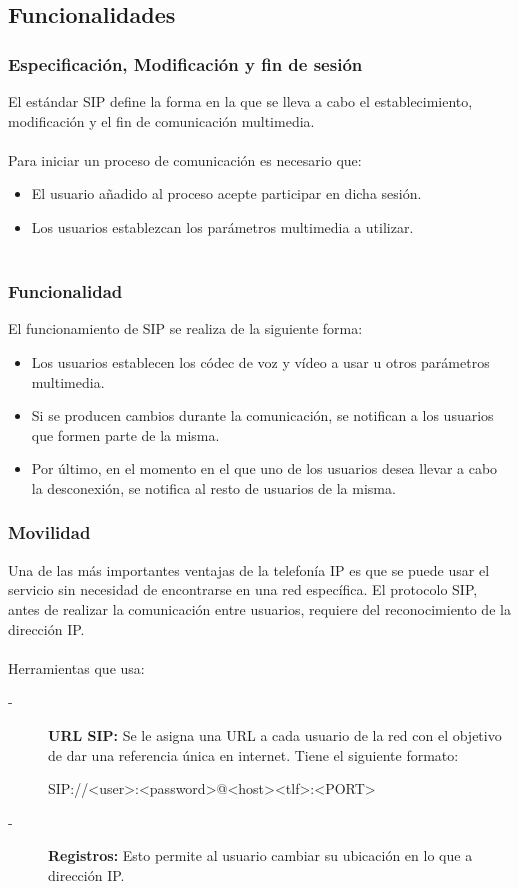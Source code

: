 \documentclass{beamer}
\begin{document}
	\subsection{Funcionalidades}
	\begin{frame}
	\frametitle{Especificación, Modificación y fin de sesión}
		El estándar SIP define la forma en la que se lleva a cabo el establecimiento, modificación y el fin de comunicación multimedia. \\~\\
		Para iniciar un proceso de comunicación es necesario que:
		\begin{itemize}
			\item El usuario añadido al proceso acepte participar en dicha sesión.
			\item Los usuarios establezcan los parámetros multimedia a utilizar.\\~\\
		\end{itemize}
	\end{frame}
	
	\begin{frame}
	\frametitle{Funcionalidad}
		El funcionamiento de SIP se realiza de la siguiente forma:
		\begin{itemize}
			\item Los usuarios establecen los códec de voz y vídeo a usar u otros parámetros multimedia.
			\item Si se producen cambios durante la comunicación, se notifican a los usuarios que formen parte de la misma.
			\item Por último, en el momento en el que uno de los usuarios desea llevar a cabo la desconexión, se notifica al resto de usuarios de la misma.
		\end{itemize}
	\end{frame}
	
	\begin{frame}
	\frametitle{Movilidad}
		Una de las más importantes ventajas de la telefonía IP es que se puede usar el servicio sin necesidad de encontrarse en una red específica. El protocolo SIP, antes de realizar la comunicación entre usuarios, requiere del reconocimiento de la dirección IP.\\~\\
		Herramientas que usa:
		\begin{description}
			\item[-]\textbf{URL SIP:} Se le asigna una URL a cada usuario de la red con el objetivo de dar una referencia única en internet. Tiene el siguiente formato:\\
			\begin{example}
				SIP://<user>:<password>@<host><tlf>:<PORT>
			\end{example}
	
			\item[-]\textbf{Registros:} Esto permite al usuario cambiar su ubicación en lo que a dirección IP.
		\end{description}
	\end{frame}
	
\end{document}
